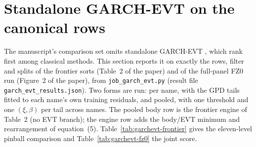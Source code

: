 \documentclass[11pt]{article}
\begin{document}
\section{Standalone GARCH-EVT on the canonical rows}\label{sec:garchevt-oa}
The manuscript's comparison set omits standalone GARCH-EVT \citep{mcneilfrey2000}, which \citet{kuester2006} rank first among classical methods. This section reports it on exactly the rows, filter and splits of the frontier sorts (Table~2 of the paper) and of the full-panel FZ0 run (Figure~2 of the paper), from \texttt{job\_garch\_evt.py} (result file \texttt{garch\_evt\_results.json}). Two forms are run: per name, with the GPD tails fitted to each name's own training residuals, and pooled, with one threshold and one $(\xi,\beta)$ per tail across names. The pooled body row is the frontier engine of Table~2 (no EVT branch); the engine row adds the body/EVT minimum and rearrangement of equation~(5). Table~\ref{tab:garchevt-frontier} gives the eleven-level pinball comparison and Table~\ref{tab:garchevt-fz0} the joint score.
\end{document}
